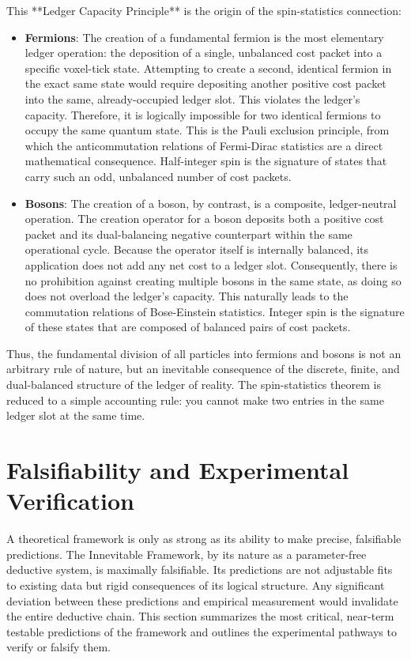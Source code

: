 \documentclass[11pt,a4paper]{article}
\begin{document}
This **Ledger Capacity Principle** is the origin of the spin-statistics connection:

\begin{itemize}
    \item \textbf{Fermions}: The creation of a fundamental fermion is the most elementary ledger operation: the deposition of a single, unbalanced cost packet into a specific voxel-tick state. Attempting to create a second, identical fermion in the exact same state would require depositing another positive cost packet into the same, already-occupied ledger slot. This violates the ledger's capacity. Therefore, it is logically impossible for two identical fermions to occupy the same quantum state. This is the Pauli exclusion principle, from which the anticommutation relations of Fermi-Dirac statistics are a direct mathematical consequence. Half-integer spin is the signature of states that carry such an odd, unbalanced number of cost packets.

    \item \textbf{Bosons}: The creation of a boson, by contrast, is a composite, ledger-neutral operation. The creation operator for a boson deposits both a positive cost packet and its dual-balancing negative counterpart within the same operational cycle. Because the operator itself is internally balanced, its application does not add any net cost to a ledger slot. Consequently, there is no prohibition against creating multiple bosons in the same state, as doing so does not overload the ledger's capacity. This naturally leads to the commutation relations of Bose-Einstein statistics. Integer spin is the signature of these states that are composed of balanced pairs of cost packets.
\end{itemize}

Thus, the fundamental division of all particles into fermions and bosons is not an arbitrary rule of nature, but an inevitable consequence of the discrete, finite, and dual-balanced structure of the ledger of reality. The spin-statistics theorem is reduced to a simple accounting rule: you cannot make two entries in the same ledger slot at the same time.

\section{Falsifiability and Experimental Verification}

A theoretical framework is only as strong as its ability to make precise, falsifiable predictions. The Innevitable Framework, by its nature as a parameter-free deductive system, is maximally falsifiable. Its predictions are not adjustable fits to existing data but rigid consequences of its logical structure. Any significant deviation between these predictions and empirical measurement would invalidate the entire deductive chain. This section summarizes the most critical, near-term testable predictions of the framework and outlines the experimental pathways to verify or falsify them.
\end{document}
